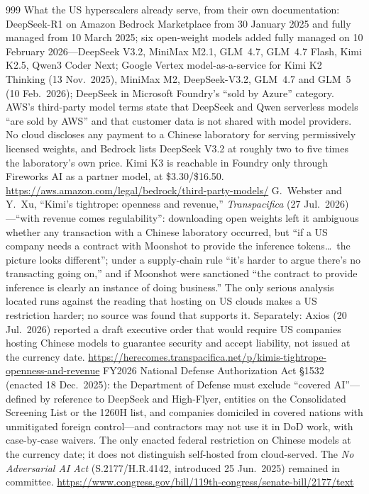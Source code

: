 \begin{thebibliography}{999}
 What the US hyperscalers already serve, from their own documentation: DeepSeek-R1 on Amazon Bedrock Marketplace from 30 January 2025 and fully managed from 10 March 2025; six open-weight models added fully managed on 10 February 2026---DeepSeek V3.2, MiniMax M2.1, GLM~4.7, GLM~4.7 Flash, Kimi K2.5, Qwen3 Coder Next; Google Vertex model-as-a-service for Kimi K2 Thinking (13 Nov.\ 2025), MiniMax M2, DeepSeek-V3.2, GLM~4.7 and GLM~5 (10 Feb.\ 2026); DeepSeek in Microsoft Foundry's ``sold by Azure'' category. AWS's third-party model terms state that DeepSeek and Qwen serverless models ``are sold by AWS'' and that customer data is not shared with model providers. No cloud discloses any payment to a Chinese laboratory for serving permissively licensed weights, and Bedrock lists DeepSeek V3.2 at roughly two to five times the laboratory's own price. Kimi K3 is reachable in Foundry only through Fireworks AI as a partner model, at \$3.30/\$16.50. \url{https://aws.amazon.com/legal/bedrock/third-party-models/}
 G.~Webster and Y.~Xu, ``Kimi's tightrope: openness and revenue,'' \emph{Transpacifica} (27 Jul.\ 2026)---``with revenue comes regulability'': downloading open weights left it ambiguous whether any transaction with a Chinese laboratory occurred, but ``if a US company needs a contract with Moonshot to provide the inference tokens\ldots\ the picture looks different''; under a supply-chain rule ``it's harder to argue there's no transacting going on,'' and if Moonshot were sanctioned ``the contract to provide inference is clearly an instance of doing business.'' The only serious analysis located runs against the reading that hosting on US clouds makes a US restriction harder; no source was found that supports it. Separately: Axios (20 Jul.\ 2026) reported a draft executive order that would require US companies hosting Chinese models to guarantee security and accept liability, not issued at the currency date. \url{https://herecomes.transpacifica.net/p/kimis-tightrope-openness-and-revenue}
 FY2026 National Defense Authorization Act \S1532 (enacted 18 Dec.\ 2025): the Department of Defense must exclude ``covered AI''---defined by reference to DeepSeek and High-Flyer, entities on the Consolidated Screening List or the 1260H list, and companies domiciled in covered nations with unmitigated foreign control---and contractors may not use it in DoD work, with case-by-case waivers. The only enacted federal restriction on Chinese models at the currency date; it does not distinguish self-hosted from cloud-served. The \emph{No Adversarial AI Act} (S.2177/H.R.4142, introduced 25 Jun.\ 2025) remained in committee. \url{https://www.congress.gov/bill/119th-congress/senate-bill/2177/text}

\end{thebibliography}
